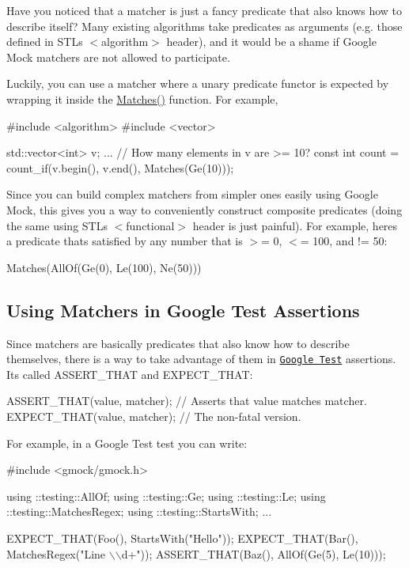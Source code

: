 Have you noticed that a matcher is just a fancy predicate that also knows how to describe itself? Many existing algorithms take predicates as arguments (e.\+g. those defined in S\+TL\textquotesingle{}s {\ttfamily $<$algorithm$>$} header), and it would be a shame if Google Mock matchers are not allowed to participate.

Luckily, you can use a matcher where a unary predicate functor is expected by wrapping it inside the {\ttfamily \hyperlink{namespacetesting_ad53b509ae9cd51040d67f668f99702ae}{Matches()}} function. For example,


\begin{DoxyCode}
#include <algorithm>
#include <vector>

std::vector<int> v;
...
// How many elements in v are >= 10?
const int count = count\_if(v.begin(), v.end(), Matches(Ge(10)));
\end{DoxyCode}


Since you can build complex matchers from simpler ones easily using Google Mock, this gives you a way to conveniently construct composite predicates (doing the same using S\+TL\textquotesingle{}s {\ttfamily $<$functional$>$} header is just painful). For example, here\textquotesingle{}s a predicate that\textquotesingle{}s satisfied by any number that is $>$= 0, $<$= 100, and != 50\+:


\begin{DoxyCode}
Matches(AllOf(Ge(0), Le(100), Ne(50)))
\end{DoxyCode}


\subsection*{Using Matchers in Google Test Assertions}

Since matchers are basically predicates that also know how to describe themselves, there is a way to take advantage of them in \href{http://code.google.com/p/googletest/}{\tt Google Test} assertions. It\textquotesingle{}s called {\ttfamily A\+S\+S\+E\+R\+T\+\_\+\+T\+H\+AT} and {\ttfamily E\+X\+P\+E\+C\+T\+\_\+\+T\+H\+AT}\+:


\begin{DoxyCode}
ASSERT\_THAT(value, matcher);  // Asserts that value matches matcher.
EXPECT\_THAT(value, matcher);  // The non-fatal version.
\end{DoxyCode}


For example, in a Google Test test you can write\+:


\begin{DoxyCode}
#include <gmock/gmock.h>

using ::testing::AllOf;
using ::testing::Ge;
using ::testing::Le;
using ::testing::MatchesRegex;
using ::testing::StartsWith;
...

  EXPECT\_THAT(Foo(), StartsWith("Hello"));
  EXPECT\_THAT(Bar(), MatchesRegex("Line \(\backslash\)\(\backslash\)d+"));
  ASSERT\_THAT(Baz(), AllOf(Ge(5), Le(10)));
\end{DoxyCode}


